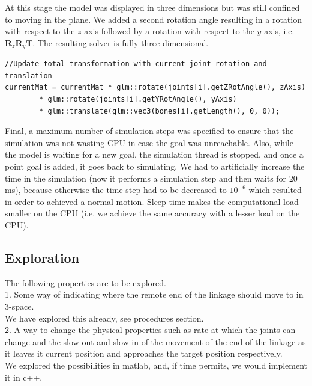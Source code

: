 \documentclass[paper=a4, fontsize=11pt]{scrartcl} %
\numberwithin{equation}{section} %
\numberwithin{figure}{section} %
\numberwithin{table}{section} %
\begin{document}
At this stage the model was displayed in three dimensions but was still confined to moving in the plane. We added a second rotation angle resulting in a rotation with respect to the \(z\)-axis followed by a rotation with respect to the \(y\)-axis, i.e. \( \mathbf{R}_z \mathbf{R}_y \mathbf{T}\). The resulting solver is fully three-dimensional. \\

\begin{mdframed}
\begin{scriptsize}
\begin{lstlisting}
//Update total transformation with current joint rotation and translation
currentMat = currentMat * glm::rotate(joints[i].getZRotAngle(), zAxis)
		* glm::rotate(joints[i].getYRotAngle(), yAxis)
		* glm::translate(glm::vec3(bones[i].getLength(), 0, 0));
\end{lstlisting}
\end{scriptsize}
\end{mdframed}

Final, a maximum number of simulation steps was specified to ensure that the simulation was not wasting CPU in case the goal was unreachable. Also, while the model is waiting for a new goal, the simulation thread is stopped, and once a point goal is added, it goes back to simulating. We had to artificially increase the time in the simulation (now it performs a simulation step and then waits for 20 ms), because otherwise the time step had to be decreased to \(10^{-6}\) which resulted in order to achieved a normal motion. Sleep time makes the computational load smaller on the CPU (i.e. we achieve the same accuracy with a lesser load on the CPU). 
  
\subsection{Exploration}
The following properties are to be explored.\\

1. Some way of indicating where the remote end of the linkage should move to in 3-space.\\
We have explored this already, see procedures section.\\

2. A way to change the physical properties such as rate at which the joints can change and the slow-out and slow-in of the movement of the end of the linkage as it leaves it current position and approaches the target position respectively.\\
We explored the possibilities in matlab, and, if time permits, we would implement it in c++.\\
\end{document}

